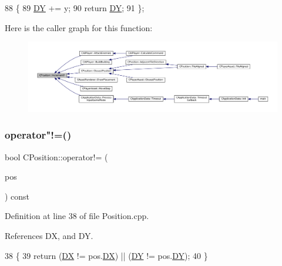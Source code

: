 \begin{DoxyCode}
88                              \{
89             \hyperlink{classCPosition_a84139c9e8eb547e7cf3cb851739943a4}{DY} += y;
90             \textcolor{keywordflow}{return} \hyperlink{classCPosition_a84139c9e8eb547e7cf3cb851739943a4}{DY};
91         \};
\end{DoxyCode}
Here is the caller graph for this function\+:\nopagebreak
\begin{figure}[H]
\begin{center}
\leavevmode
\includegraphics[width=350pt]{classCPosition_a3f2a26798bb27b1252ff1be303b3adfc_icgraph}
\end{center}
\end{figure}
\hypertarget{classCPosition_ad7a23f4b734883e26de15c2487218b07}{}\label{classCPosition_ad7a23f4b734883e26de15c2487218b07} 
\subsubsection{\texorpdfstring{operator"!=()}{operator!=()}}
{\footnotesize\ttfamily bool C\+Position\+::operator!= (\begin{DoxyParamCaption}\item[{const \hyperlink{classCPosition}{C\+Position} \&}]{pos }\end{DoxyParamCaption}) const}



Definition at line 38 of file Position.\+cpp.



References DX, and DY.


\begin{DoxyCode}
38                                                     \{
39     \textcolor{keywordflow}{return} (\hyperlink{classCPosition_a28445f9b872169715919074d82044eda}{DX} != pos.\hyperlink{classCPosition_a28445f9b872169715919074d82044eda}{DX}) || (\hyperlink{classCPosition_a84139c9e8eb547e7cf3cb851739943a4}{DY} != pos.\hyperlink{classCPosition_a84139c9e8eb547e7cf3cb851739943a4}{DY});
40 \}
\end{DoxyCode}
\hypertarget{classCPosition_ae131ec912eb7272d2bdfbdcbb7848acb}{}\label{classCPosition_ae131ec912eb7272d2bdfbdcbb7848acb} 
